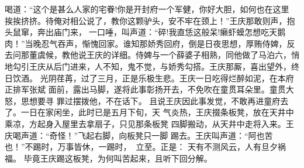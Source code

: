 喝道：“这个是甚么人家的宅眷!你是开封府一个军健，你好大胆，如何也在这里
挨挨挤挤。待俺对相公说了，教你这颗驴头，安不牢在颈上！”王庆那敢则声，抱
头鼠窜，奔出庙门来，一口唾，叫声道：“碎!我直恁这般呆!癞虾蟆怎想吃天鹅
肉！”当晚忍气吞声，惭愧回家。谁知那娇秀回府，倒是日夜思想，厚贿侍婢，反
去问那董虞候，教他说王庆的详细。侍婢与一个薛婆子相熟，同他做了马泊六，悄
地勾引王庆从后门进来，人不知，鬼不觉，与娇秀勾搭。王庆那厮，喜出望外，终
日饮酒。
光阴荏苒，过了三月，正是乐极生悲。王庆一日吃得烂醉如泥，在本府正排军张斌
面前，露出马脚，遂将此事彰扬开去，不免吹在童贯耳朵里。童贯大怒，思想要寻
罪过摆拨他，不在话下。
且说王庆因此事发觉，不敢再进童府去了。一日在家闲坐，此时已是五月下旬，天
气炎热，王庆掇条板凳，放在天井中乘凉，方起身入屋里去拿扇子，只见那条板凳
四脚搬动，从天井中走将入来。王庆喝声道：“奇怪！”飞起右脚，向板凳只一脚
踢去。王庆叫声道：“阿也苦也！”不踢时，万事皆休，一踢时，立至。正是：
天有不测风云，人有旦夕祸福。
毕竟王庆踢这板凳，为何叫苦起来，且听下回分解。